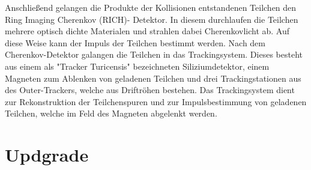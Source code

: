Anschließend gelangen die Produkte der Kollisionen entstandenen Teilchen den Ring
Imaging Cherenkov (RICH)- Detektor. In diesem  durchlaufen die Teilchen mehrere
optisch dichte Materialen und strahlen dabei Cherenkovlicht ab. Auf diese Weise
kann der Impuls der Teilchen bestimmt werden. Nach dem Cherenkov-Detektor
galangen die Teilchen in das Trackingsystem. Dieses besteht aus einem als
"Tracker Turicensis" bezeichneten Siliziumdetektor, einem Magneten zum
Ablenken von geladenen Teilchen und drei Trackingstationen aus des
Outer-Trackers, welche aus Driftröhen bestehen. Das Trackingsystem dient zur
Rekonstruktion der Teilchenspuren und zur Impulsbestimmung von geladenen
Teilchen, welche im Feld des Magneten abgelenkt werden.

\section{Updgrade}



